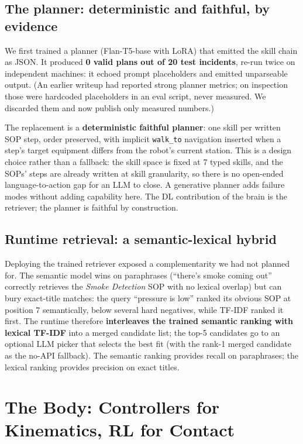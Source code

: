 \documentclass[11pt]{article}
\begin{document}
\subsection{The planner: deterministic and faithful, by evidence}

We first trained a planner (Flan-T5-base with LoRA) that emitted the skill chain as JSON. It produced \textbf{0 valid plans out of 20 test incidents}, re-run twice on independent machines: it echoed prompt placeholders and emitted unparseable output. (An earlier writeup had reported strong planner metrics; on inspection those were hardcoded placeholders in an eval script, never measured. We discarded them and now publish only measured numbers.)

The replacement is a \textbf{deterministic faithful planner}: one skill per written SOP step, order preserved, with implicit \texttt{walk\_to} navigation inserted when a step's target equipment differs from the robot's current station. This is a design choice rather than a fallback: the skill space is fixed at 7 typed skills, and the SOPs' steps are already written at skill granularity, so there is no open-ended language-to-action gap for an LLM to close. A generative planner adds failure modes without adding capability here. The DL contribution of the brain is the retriever; the planner is faithful by construction.

\subsection{Runtime retrieval: a semantic-lexical hybrid}

Deploying the trained retriever exposed a complementarity we had not planned for. The semantic model wins on paraphrases (``there's smoke coming out'' correctly retrieves the \emph{Smoke Detection} SOP with no lexical overlap) but can bury exact-title matches: the query ``pressure is low'' ranked its obvious SOP at position 7 semantically, below several hard negatives, while TF-IDF ranked it first. The runtime therefore \textbf{interleaves the trained semantic ranking with lexical TF-IDF} into a merged candidate list; the top-5 candidates go to an optional LLM picker that selects the best fit (with the rank-1 merged candidate as the no-API fallback). The semantic ranking provides recall on paraphrases; the lexical ranking provides precision on exact titles.

\section{The Body: Controllers for Kinematics, RL for Contact}
\end{document}
